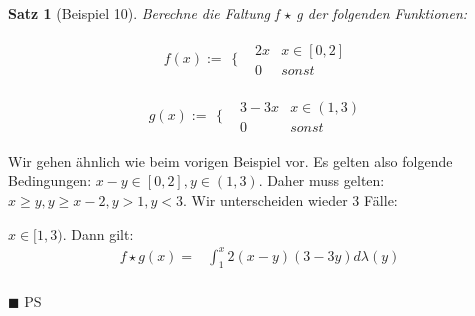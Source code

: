 \documentclass[a4paper,11pt]{article}
\newtheorem{satz}{Satz}
\numberwithin{satz}{subsection}
\newenvironment{proof}[1][]
{%
  \noindent{\bf\textit{Beweis:}}
}
{%
  \hfill$\blacksquare$ PS
  \bigskip
}
\begin{document}
\begin{satz}[Beispiel 10]
	Berechne die Faltung f $\star$ g der folgenden Funktionen:
	
	\begin{equation*}
	f(x) := \begin{array}{cc}
	\Bigg\{ & \begin{array}{cc}
	2x & x \in [0,2]  \\
	0 & sonst
	\end{array}
	\end{array}
	\end{equation*}
	
	\begin{equation*}
	g(x) := \begin{array}{cc}
	\Bigg\{ & \begin{array}{cc}
	3 -3x & x \in (1, 3)  \\
	0 & sonst
	\end{array}
	\end{array}
	\end{equation*}
\end{satz}

\begin{proof}
	Wir gehen ähnlich wie beim vorigen Beispiel vor. Es gelten also folgende Bedingungen: $x - y \in [0,2], y \in (1,3)$. Daher muss gelten: $x \ge y, y \ge x - 2, y > 1, y < 3$. Wir unterscheiden wieder 3 Fälle:
	
	$x \in [1, 3)$. Dann gilt:
	\begin{equation*}
	\begin{split}
	f \star g (x) = & \int_{1}^{x} 2 (x - y) (3 - 3y)d\lambda(y) \\
	\end{split}
	
	\end{equation*}
	
\end{proof}
\end{document}
